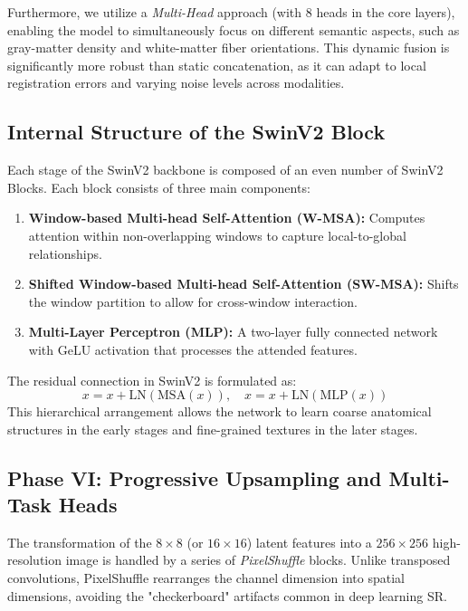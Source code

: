 Furthermore, we utilize a \textit{Multi-Head} approach (with 8 heads in the core layers), enabling the model to simultaneously focus on different semantic aspects, such as gray-matter density and white-matter fiber orientations. This dynamic fusion is significantly more robust than static concatenation, as it can adapt to local registration errors and varying noise levels across modalities.

\subsection{Internal Structure of the SwinV2 Block}
Each stage of the SwinV2 backbone is composed of an even number of SwinV2 Blocks. Each block consists of three main components:
\begin{enumerate}
    \item \textbf{Window-based Multi-head Self-Attention (W-MSA):} Computes attention within non-overlapping windows to capture local-to-global relationships.
    \item \textbf{Shifted Window-based Multi-head Self-Attention (SW-MSA):} Shifts the window partition to allow for cross-window interaction.
    \item \textbf{Multi-Layer Perceptron (MLP):} A two-layer fully connected network with GeLU activation that processes the attended features.
\end{enumerate}
The residual connection in SwinV2 is formulated as:
\begin{equation}
    x = x + \text{LN}(\text{MSA}(x)), \quad x = x + \text{LN}(\text{MLP}(x))
\end{equation}
This hierarchical arrangement allows the network to learn coarse anatomical structures in the early stages and fine-grained textures in the later stages.

\subsection{Phase VI: Progressive Upsampling and Multi-Task Heads}
The transformation of the $8 \times 8$ (or $16 \times 16$) latent features into a $256 \times 256$ high-resolution image is handled by a series of \textit{PixelShuffle} blocks. Unlike transposed convolutions, PixelShuffle rearranges the channel dimension into spatial dimensions, avoiding the "checkerboard" artifacts common in deep learning SR.

